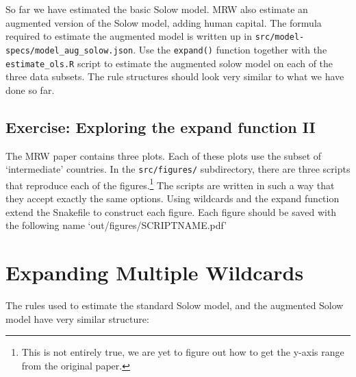 \documentclass[]{book}
\let\rmarkdownfootnote\footnote%
\def\footnote{\protect\rmarkdownfootnote}
\theoremstyle{definition}
\theoremstyle{definition}
\theoremstyle{definition}
\theoremstyle{remark}
\begin{document}
So far we have estimated the basic Solow model. MRW also estimate an
augmented version of the Solow model, adding human capital. The formula
required to estimate the augmented model is written up in
\texttt{src/model-specs/model\_aug\_solow.json}. Use the
\texttt{expand()} function together with the \texttt{estimate\_ols.R}
script to estimate the augmented solow model on each of the three data
subsets. The rule structures should look very similar to what we have
done so far.

\subsection*{Exercise: Exploring the expand function
II}\label{exercise-exploring-the-expand-function-ii}

The MRW paper contains three plots. Each of these plots use the subset
of `intermediate' countries. In the \texttt{src/figures/} subdirectory,
there are three scripts that reproduce each of the figures.\footnote{This
  is not entirely true, we are yet to figure out how to get the y-axis
  range from the original paper.} The scripts are written in such a way
that they accept exactly the same options. Using wildcards and the
expand function extend the Snakefile to construct each figure. Each
figure should be saved with the following name
`out/figures/SCRIPTNAME.pdf'

\section{Expanding Multiple
Wildcards}\label{expanding-multiple-wildcards}

The rules used to estimate the standard Solow model, and the augmented
Solow model have very similar structure:
\end{document}
